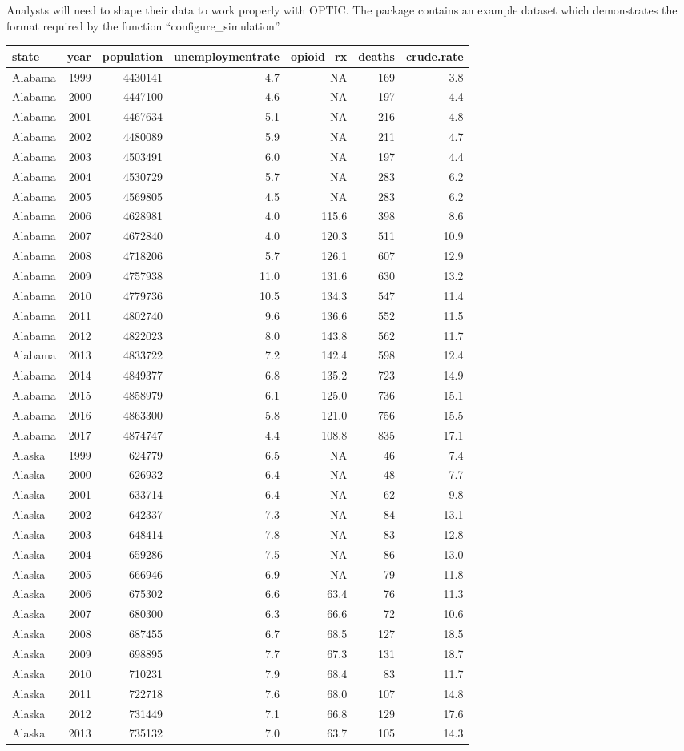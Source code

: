 \documentclass[
]{article}
\begin{document}
Analysts will need to shape their data to work properly with OPTIC. The
package contains an example dataset which demonstrates the format
required by the function ``configure\_simulation''.

\begin{longtable}[]{@{}lrrrrrr@{}}
\toprule
state & year & population & unemploymentrate & opioid\_rx & deaths &
crude.rate\tabularnewline
\midrule
\endhead
Alabama & 1999 & 4430141 & 4.7 & NA & 169 & 3.8\tabularnewline
Alabama & 2000 & 4447100 & 4.6 & NA & 197 & 4.4\tabularnewline
Alabama & 2001 & 4467634 & 5.1 & NA & 216 & 4.8\tabularnewline
Alabama & 2002 & 4480089 & 5.9 & NA & 211 & 4.7\tabularnewline
Alabama & 2003 & 4503491 & 6.0 & NA & 197 & 4.4\tabularnewline
Alabama & 2004 & 4530729 & 5.7 & NA & 283 & 6.2\tabularnewline
Alabama & 2005 & 4569805 & 4.5 & NA & 283 & 6.2\tabularnewline
Alabama & 2006 & 4628981 & 4.0 & 115.6 & 398 & 8.6\tabularnewline
Alabama & 2007 & 4672840 & 4.0 & 120.3 & 511 & 10.9\tabularnewline
Alabama & 2008 & 4718206 & 5.7 & 126.1 & 607 & 12.9\tabularnewline
Alabama & 2009 & 4757938 & 11.0 & 131.6 & 630 & 13.2\tabularnewline
Alabama & 2010 & 4779736 & 10.5 & 134.3 & 547 & 11.4\tabularnewline
Alabama & 2011 & 4802740 & 9.6 & 136.6 & 552 & 11.5\tabularnewline
Alabama & 2012 & 4822023 & 8.0 & 143.8 & 562 & 11.7\tabularnewline
Alabama & 2013 & 4833722 & 7.2 & 142.4 & 598 & 12.4\tabularnewline
Alabama & 2014 & 4849377 & 6.8 & 135.2 & 723 & 14.9\tabularnewline
Alabama & 2015 & 4858979 & 6.1 & 125.0 & 736 & 15.1\tabularnewline
Alabama & 2016 & 4863300 & 5.8 & 121.0 & 756 & 15.5\tabularnewline
Alabama & 2017 & 4874747 & 4.4 & 108.8 & 835 & 17.1\tabularnewline
Alaska & 1999 & 624779 & 6.5 & NA & 46 & 7.4\tabularnewline
Alaska & 2000 & 626932 & 6.4 & NA & 48 & 7.7\tabularnewline
Alaska & 2001 & 633714 & 6.4 & NA & 62 & 9.8\tabularnewline
Alaska & 2002 & 642337 & 7.3 & NA & 84 & 13.1\tabularnewline
Alaska & 2003 & 648414 & 7.8 & NA & 83 & 12.8\tabularnewline
Alaska & 2004 & 659286 & 7.5 & NA & 86 & 13.0\tabularnewline
Alaska & 2005 & 666946 & 6.9 & NA & 79 & 11.8\tabularnewline
Alaska & 2006 & 675302 & 6.6 & 63.4 & 76 & 11.3\tabularnewline
Alaska & 2007 & 680300 & 6.3 & 66.6 & 72 & 10.6\tabularnewline
Alaska & 2008 & 687455 & 6.7 & 68.5 & 127 & 18.5\tabularnewline
Alaska & 2009 & 698895 & 7.7 & 67.3 & 131 & 18.7\tabularnewline
Alaska & 2010 & 710231 & 7.9 & 68.4 & 83 & 11.7\tabularnewline
Alaska & 2011 & 722718 & 7.6 & 68.0 & 107 & 14.8\tabularnewline
Alaska & 2012 & 731449 & 7.1 & 66.8 & 129 & 17.6\tabularnewline
Alaska & 2013 & 735132 & 7.0 & 63.7 & 105 & 14.3\tabularnewline

\end{longtable}
\end{document}

